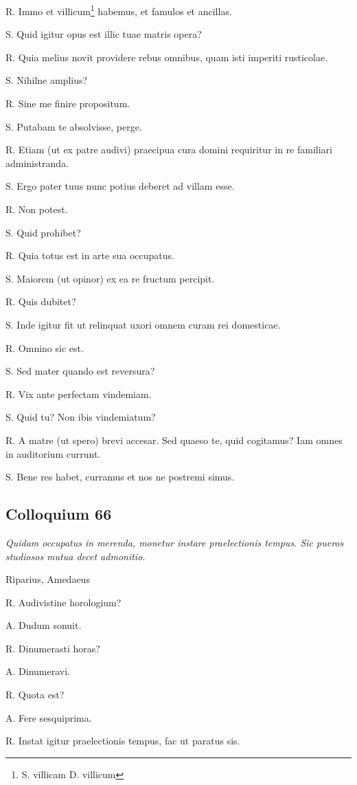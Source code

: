 \documentclass{article}
\begin{document}
R. Immo et villicum\footnote{S. villicam D. villicum} habemus, et famulos et ancillas.

S. Quid igitur opus est illic tuae matris opera?

R. Quia melius novit providere rebus omnibus, quam isti imperiti rusticolae.

S. Nihilne amplius?

R. Sine me finire propositum.

S. Putabam te absolvisse, perge.

R. Etiam (ut ex patre audivi) praecipua cura domini requiritur in re familiari administranda.

S. Ergo pater tuus nunc potius deberet ad villam esse.

R. Non potest.

S. Quid prohibet?

R. Quia totus est in arte sua occupatus.

S. Maiorem (ut opinor) ex ea re fructum percipit.

R. Quis dubitet?

S. Inde igitur fit ut relinquat uxori omnem curam rei domesticae.

R. Omnino sic est.

S. Sed mater quando est reversura?

R. Vix ante perfectam vindemiam.

S. Quid tu? Non ibis vindemiatum?

R. A matre (ut spero) brevi accesar. Sed quaeso te, quid cogitamus? Iam omnes in auditorium currunt.

S. Bene res habet, curramus et nos ne postremi simus.

\subsection{Colloquium 66}
\emph{Quidam occupatus in merenda, monetur instare praelectionis tempus. Sic pueros studiosos mutua decet admonitio.}

Riparius, Amedaeus

R. Audivistine horologium?

A. Dudum sonuit.

R. Dinumerasti horas?

A. Dinumeravi.

R. Quota est?

A. Fere sesquiprima.

R. Instat igitur praelectionis tempus, fac ut paratus sis.
\end{document}
